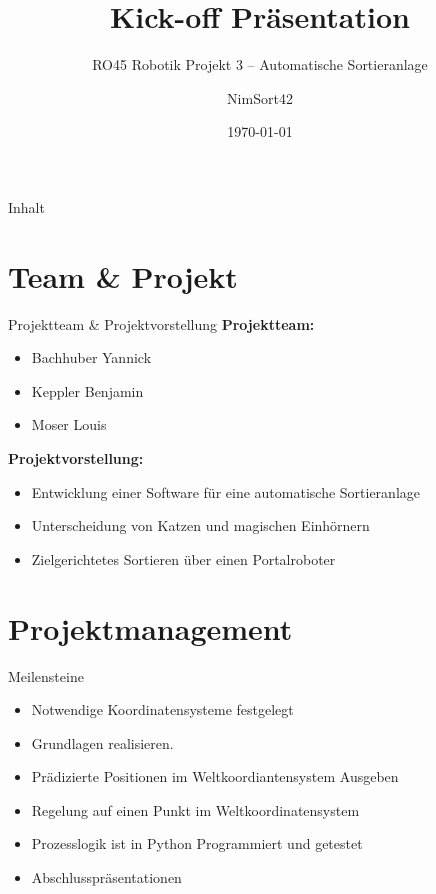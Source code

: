 \documentclass[aspectratio=169]{beamer}
\title[Kurztitel]{Kick-off Präsentation}
\subtitle{RO45 Robotik Projekt 3 – Automatische Sortieranlage}
\author{NimSort42}
\institute{Hochschule Kempten}
\date{\today}
\begin{document}
	
	\begin{frame}
		\titlepage
	\end{frame}
	
	\begin{frame}{Inhalt}
		\tableofcontents
	\end{frame}
	
	\section{Team \& Projekt}
	
	\begin{frame}{Projektteam \& Projektvorstellung}
		\textbf{Projektteam:}
		\begin{itemize}
			\item Bachhuber Yannick
			\item Keppler Benjamin
			\item Moser Louis
		\end{itemize}
		
		\vspace{6mm}
		
		\textbf{Projektvorstellung:}
		\begin{itemize}
			\item Entwicklung einer Software für eine automatische Sortieranlage
			\item Unterscheidung von Katzen und magischen Einhörnern
			\item Zielgerichtetes Sortieren über einen Portalroboter
		\end{itemize}
	\end{frame}
	
	\section{Projektmanagement}
	
	\begin{frame}{Meilensteine}
		\begin{itemize}
			\item Notwendige Koordinatensysteme festgelegt 
			\item Grundlagen realisieren. 
			\item Prädizierte Positionen im Weltkoordiantensystem Ausgeben 
			\item Regelung auf einen Punkt im Weltkoordinatensystem 
			\item Prozesslogik ist in Python Programmiert und getestet 
			\item Abschlusspräsentationen 
		\end{itemize}
	\end{frame}
	
\end{document}
